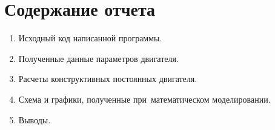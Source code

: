 \documentclass[12pt,a4paper,openany]{extarticle}
\begin{document}
\newpage
\section{Содержание отчета}
\begin{enumerate}
\item Исходный код написанной программы.
\item Полученные данные параметров двигателя.
\item Расчеты конструктивных постоянных двигателя.
\item Схема и графики, полученные при~математическом моделировании.
\item Выводы.
\end{enumerate}
\end{document}
